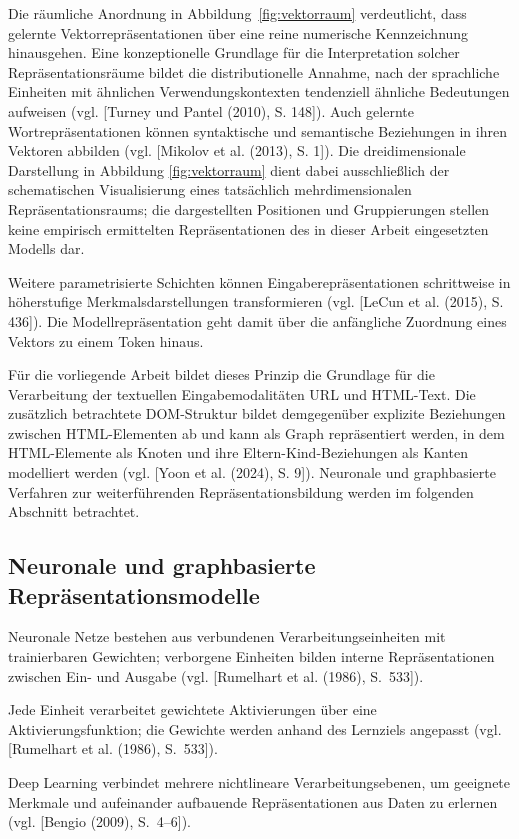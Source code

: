 Die räumliche Anordnung in Abbildung~\ref{fig:vektorraum} verdeutlicht, dass
gelernte Vektorrepräsentationen über eine reine numerische Kennzeichnung
hinausgehen. Eine konzeptionelle Grundlage für die Interpretation
solcher Repräsentationsräume bildet die distributionelle Annahme, nach der
sprachliche Einheiten mit ähnlichen Verwendungskontexten tendenziell ähnliche
Bedeutungen aufweisen
(vgl. [Turney und Pantel (2010), S. 148]).
Auch gelernte Wortrepräsentationen können syntaktische und semantische Beziehungen
in ihren Vektoren abbilden
(vgl. [Mikolov et al. (2013), S. 1]).
Die dreidimensionale Darstellung in Abbildung \ref{fig:vektorraum} dient dabei
ausschließlich der schematischen Visualisierung eines tatsächlich
mehrdimensionalen Repräsentationsraums; die dargestellten Positionen und
Gruppierungen stellen keine empirisch ermittelten Repräsentationen des in dieser
Arbeit eingesetzten Modells dar.

Weitere parametrisierte Schichten können Eingaberepräsentationen schrittweise in höherstufige Merkmalsdarstellungen transformieren (vgl. [LeCun et al. (2015), S. 436]). Die Modellrepräsentation geht damit über die anfängliche Zuordnung eines Vektors zu einem Token hinaus.

Für die vorliegende Arbeit bildet dieses Prinzip die Grundlage für die Verarbeitung
der textuellen Eingabemodalitäten URL und HTML-Text. Die zusätzlich betrachtete
DOM-Struktur bildet demgegenüber explizite Beziehungen zwischen HTML-Elementen ab
und kann als Graph repräsentiert werden, in dem HTML-Elemente als Knoten und ihre
Eltern-Kind-Beziehungen als Kanten modelliert werden
(vgl. [Yoon et al. (2024), S. 9]). Neuronale und graphbasierte Verfahren zur
weiterführenden Repräsentationsbildung werden im folgenden Abschnitt betrachtet.

\subsection{Neuronale und graphbasierte Repräsentationsmodelle}

Neuronale Netze bestehen aus verbundenen Verarbeitungseinheiten mit trainierbaren Gewichten; verborgene Einheiten bilden interne Repräsentationen zwischen Ein- und Ausgabe (vgl. [Rumelhart et al. (1986), S.~533]).

Jede Einheit verarbeitet gewichtete Aktivierungen über eine Aktivierungsfunktion; die Gewichte werden anhand des Lernziels angepasst (vgl. [Rumelhart et al. (1986), S.~533]).

Deep Learning verbindet mehrere nichtlineare Verarbeitungsebenen, um geeignete Merkmale und aufeinander aufbauende Repräsentationen aus Daten zu erlernen (vgl. [Bengio (2009), S.~4--6]).


